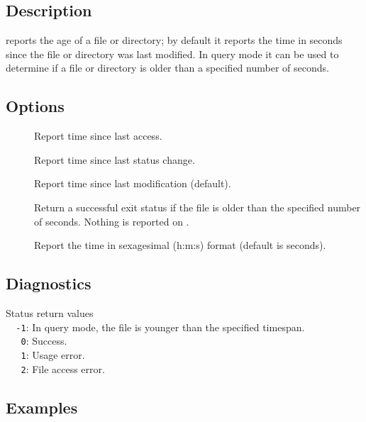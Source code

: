 \begin{synopsis}
\end{synopsis}

\subsection*{Description}

 reports the age of a file or directory; by default it reports the
time in seconds since the file or directory was last modified.  In query mode
it can be used to determine if a file or directory is older than a specified
number of seconds.

\subsection*{Options}

\begin{description}
\item[]
   Report time since last access.

\item[]
   Report time since last status change.

\item[]
   Report time since last modification (default).

\item[]
   Return a successful exit status if the file is older than the specified
   number of seconds.  Nothing is reported on .

\item[]
   Report the time in sexagesimal (h:m:s) format (default is seconds).
\end{description}

\subsection*{Diagnostics}

Status return values
\\ \verb+  -1+:  In query mode, the file is younger than the specified timespan.
\\ \verb+   0+:  Success.
\\ \verb+   1+:  Usage error.
\\ \verb+   2+:  File access error.

\subsection*{Examples}

